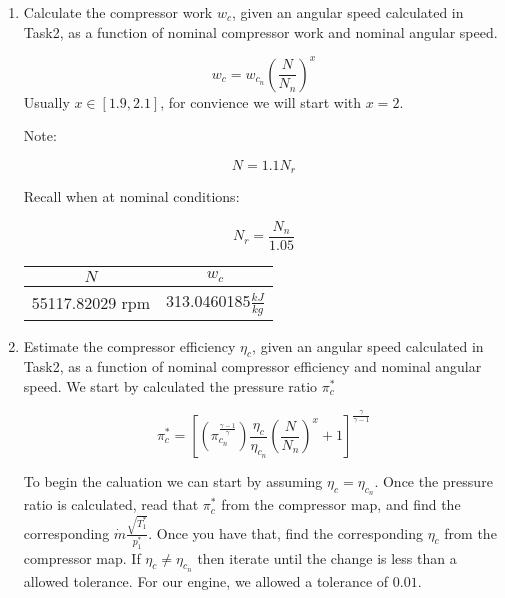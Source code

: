 \documentclass[titlepage]{article}
\begin{document}
\begin{enumerate}
  \item Calculate the compressor work $w_{c}$, given an angular speed calculated
  in Task2, as a function of nominal compressor work and nominal angular speed.

  \begin{equation}
    w_{c} = w_{c_{n}} \left( \frac{N}{N_{n}} \right)^{x}
  \end{equation}
  Usually $x \in [1.9, 2.1]$, for convience we will start with $x = 2$.

  Note: 

  \begin{equation}
    N = 1.1N_{r}
  \end{equation}

  Recall when at nominal conditions:

  \begin{equation}
    N_{r} = \frac{N_{n}}{1.05}
  \end{equation}

  \begin{center}
    \begin{tabular}{|c|c|}
      \hline
      $N$ & $w_{c}$ \\
      \hline
      55117.82029 rpm & 313.0460185$\frac{kJ}{kg}$ \\
      \hline
    \end{tabular}
  \end{center}

  \item Estimate the compressor efficiency $\eta_{c}$, given an angular 
  speed calculated in Task2, as a function of nominal compressor efficiency and
  nominal angular speed. We start by calculated the pressure ratio $\pi_{c}^{*}$

  \begin{equation}
    \pi_{c}^{*} = \left[ \left(\pi_{c_{n}}^{\frac{\gamma-1}{\gamma}}\right)
    \frac{\eta_{c}}{\eta_{c_{n}}} \left(\frac{N}{N_{n}}\right)^{x} +1 \right]^{\frac{\gamma}{\gamma-1}}
  \end{equation}

  To begin the caluation we can start by assuming $\eta_{c} = \eta_{c_{n}}$. Once
  the pressure ratio is calculated, read that $\pi_{c}^{*}$ from the compressor map, 
  and find the corresponding $\dot{m}\frac{\sqrt{T_{1}^{*}}}{p_{1}^{*}}$. Once you have 
  that, find the corresponding $\eta_{c}$ from the compressor map. If $\eta_{c} \neq \eta_{c_{n}}$ 
  then iterate until the change is less than a allowed tolerance. For our engine,
  we allowed a tolerance of $0.01$.


\end{enumerate}
\end{document}
